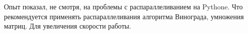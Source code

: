 \documentclass[../main.tex]{subfiles}
\begin{document}
	
	Опыт показал, не смотря, на проблемы с распараллеливанием на Pythone. 
	Что рекомендуется применять распараллеливания алгоритма Винограда, умножения матриц. Для увеличения скорости работы.
	
\end{document}
